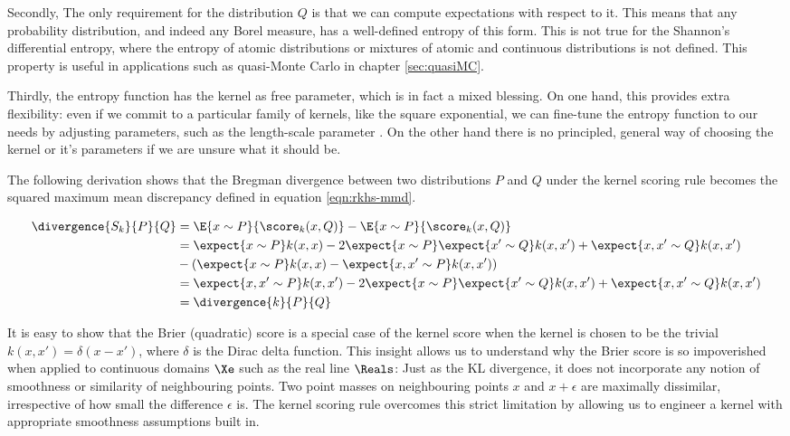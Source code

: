 Secondly, The only requirement for the distribution $Q$ is that we can compute expectations with respect to it. This means that any probability distribution, and indeed any Borel measure, has a well-defined entropy of this form. This is not true for the Shannon's differential entropy, where the entropy of atomic distributions or mixtures of atomic and continuous distributions is not defined. This property is useful in applications such as quasi-Monte Carlo in chapter \ref{sec:quasiMC}.

Thirdly, the entropy function has the kernel as free parameter, which is in fact a mixed blessing. On one hand, this provides extra flexibility: even if we commit to a particular family of kernels, like the square exponential, we can fine-tune the entropy function to our needs by adjusting parameters, such as the length-scale parameter \citep{tailoring}. On the other hand there is no principled, general way of choosing the kernel or it's parameters if we are unsure what it should be.

The following derivation shows that the Bregman divergence between two distributions $P$ and $Q$ under the kernel scoring rule becomes the squared maximum mean discrepancy defined in equation \eqref{eqn:rkhs-mmd}.

\begin{align}
	\divergence{S_k}{P}{Q} &= \E{x\sim P}{\score_{k}(x,Q)} - \E{x\sim P}{\score_k(x,Q)}\\ 
		&= \expect{x\sim P} k(x,x) - 2 \expect{x\sim P}\expect{x' \sim Q} k(x,x') + \expect{x,x'\sim Q} k(x,x')\\
		&- \left( \expect{x \sim P} k(x,x) - \expect{x,x'\sim P} k(x,x') \right)\\
		&=  \expect{x,x'\sim P} k(x,x')	- 2 \expect{x\sim P}\expect{x'\sim Q} k(x,x') + \expect{x,x'\sim Q} k(x,x')\\
		&= \divergence{k}{P}{Q}
\end{align}

 It is easy to show that the Brier (quadratic) score is a special case of the kernel score when the kernel is chosen to be the trivial $k(x,x') = \delta(x - x')$, where $\delta$ is the Dirac delta function. This insight allows us to understand why the Brier score is so impoverished when applied to continuous domains $\Xe$ such as the real line $\Reals$: Just as the KL divergence, it does not incorporate any notion of smoothness or similarity of neighbouring points. Two point masses on neighbouring points $x$ and $x+\epsilon$ are maximally dissimilar, irrespective of how small the difference $\epsilon$ is. The kernel scoring rule overcomes this strict limitation by allowing us to engineer a kernel with appropriate smoothness assumptions built in.

